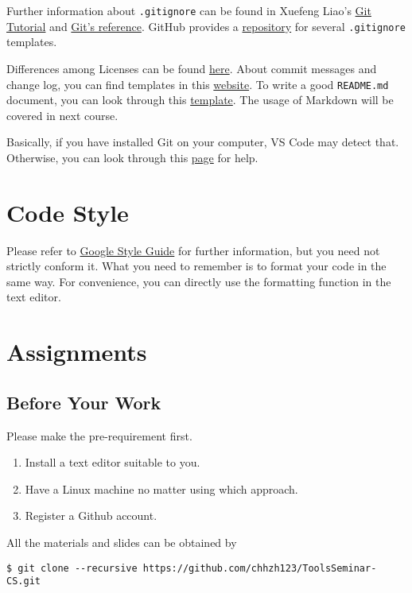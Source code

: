 \documentclass[english]{../TexTemplate/thesis}
\begin{document}
Further information about \verb".gitignore" can be found in Xuefeng Liao's \href{https://www.liaoxuefeng.com/wiki/0013739516305929606dd18361248578c67b8067c8c017b000/0013758404317281e54b6f5375640abbb11e67be4cd49e0000}{Git Tutorial} and \href{https://git-scm.com/docs/gitignore}{Git's reference}. GitHub provides a \href{https://github.com/github/gitignore}{repository} for several \verb".gitignore" templates.

Differences among Licenses can be found \href{https://choosealicense.com/licenses/}{here}.
About commit messages and change log, you can find templates in this \href{https://blog.coding.net/blog/commit_message_change_log}{website}.
To write a good \verb'README.md' document, you can look through this \href{https://gist.github.com/PurpleBooth/109311bb0361f32d87a2}{template}.
The usage of Markdown will be covered in next course.

Basically, if you have installed Git on your computer, VS Code may detect that.
Otherwise, you can look through this \href{https://code.visualstudio.com/docs/editor/versioncontrol}{page} for help.

\section{Code Style}
Please refer to \href{http://google.github.io/styleguide/}{Google Style Guide} for further information, but you need not strictly conform it.
What you need to remember is to format your code in the same way.
For convenience, you can directly use the formatting function in the text editor.

\newpage
\section{Assignments}
\subsection{Before Your Work}
Please make the pre-requirement first.
\begin{enumerate}
\item Install a text editor suitable to you.
\item Have a Linux machine no matter using which approach.
\item Register a Github account.
\end{enumerate}

All the materials and slides can be obtained by
\begin{lstlisting}
$ git clone --recursive https://github.com/chhzh123/ToolsSeminar-CS.git
\end{lstlisting}
\end{document}
